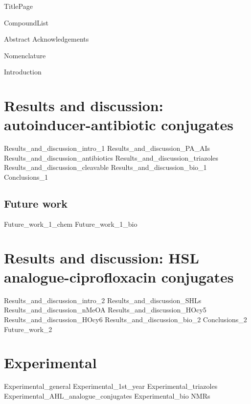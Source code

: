 \documentclass[10pt,a4paper]{article}
\begin{document}
{TitlePage}

{CompoundList}

\tableofcontents

{Abstract}
{Acknowledgements}

\newpage
{Nomenclature}
\printnomenclature

\newpage
{Introduction}

\newpage
\section{Results and discussion: autoinducer-antibiotic conjugates\label{sec:AACs}}
{Results_and_discussion_intro_1}
{Results_and_discussion_PA_AIs}
{Results_and_discussion_antibiotics}
{Results_and_discussion_triazoles}
{Results_and_discussion_cleavable}
{Results_and_discussion_bio_1}
{Conclusions_1}
\subsection{Future work \label{sec:Fut1}}
{Future_work_1_chem}
{Future_work_1_bio}

\newpage
\section{Results and discussion: HSL analogue-ciprofloxacin conjugates\label{sec:HSLCipCs}}
{Results_and_discussion_intro_2}
{Results_and_discussion_SHLs}
{Results_and_discussion_nMeOA}
{Results_and_discussion_HOcy5}
{Results_and_discussion_HOcy6}
{Results_and_discussion_bio_2}
{Conclusions_2}
{Future_work_2}

\newpage
\section{Experimental}
{Experimental_general}
{Experimental_1st_year}
{Experimental_triazoles}
{Experimental_AHL_analogue_conjugates}
{Experimental_bio}
{NMRs}


\newpage
{}


\listoftodos
\end{document}

